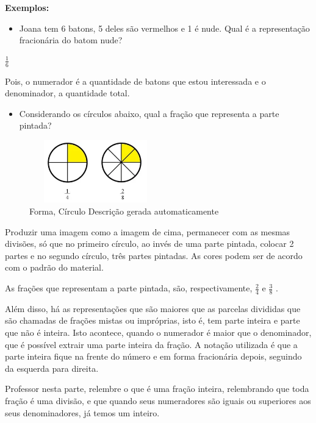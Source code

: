 \textbf{Exemplos:}

\begin{itemize}
\tightlist
\item
  Joana tem 6 batons, 5 deles são vermelhos e 1 é nude. Qual é a
  representação fracionária do batom nude?
\end{itemize}

\(\frac{1}{6}\)

Pois, o numerador é a quantidade de batons que estou interessada e o
denominador, a quantidade total.

\begin{itemize}
\tightlist
\item
  Considerando os círculos abaixo, qual a fração que representa a parte
  pintada?
\end{itemize}

\begin{figure}
\centering
\includegraphics[width=2.26042in,height=1.06783in]{./imgSAEB_7_MAT/media/image4.png}
\caption{Forma, Círculo Descrição gerada automaticamente}
\end{figure}

Produzir uma imagem como a imagem de cima, permanecer com as mesmas
divisões, só que no primeiro círculo, ao invés de uma parte pintada,
colocar 2 partes e no segundo círculo, três partes pintadas. As cores
podem ser de acordo com o padrão do material.

As frações que representam a parte pintada, são, respectivamente,
\(\frac{2}{4}\) e \(\frac{3}{8}\) .

Além disso, há as representações que são maiores que as parcelas
divididas que são chamadas de frações mistas ou impróprias, isto é, tem
parte inteira e parte que não é inteira. Isto acontece, quando o
numerador é maior que o denominador, que é possível extrair uma parte
inteira da fração. A notação utilizada é que a parte inteira fique na
frente do número e em forma fracionária depois, seguindo da esquerda
para direita.

Professor nesta parte, relembre o que é uma fração inteira, relembrando
que toda fração é uma divisão, e que quando seus numeradores são iguais
ou superiores aos seus denominadores, já temos um inteiro.


